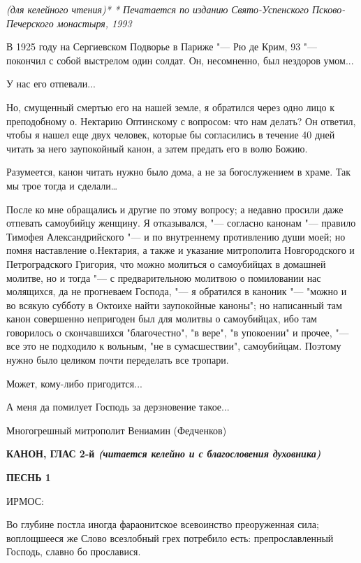 \mychapterending

 


\itshape (для келейного чтения)* * Печатается по изданию Свято-Успенского Псково-Печерского монастыря, 1993


В 1925 году на Сергиевском Подворье в Париже "--- Рю де Крим, 93 "--- покончил с собой выстрелом один солдат. Он, несомненно, был нездоров умом...


У нас его отпевали...


Но, смущенный смертью его на нашей земле, я обратился через одно лицо к преподобному о. Нектарию Оптинскому с вопросом: что нам делать? Он ответил, чтобы я нашел еще двух человек, которые бы согласились в течение 40 дней читать за него заупокойный канон, а затем предать его в волю Божию.


Разумеется, канон читать нужно было дома, а не за богослужением в храме. Так мы трое тогда и сделали…


После ко мне обращались и другие по этому вопросу; а недавно просили даже отпевать самоубийцу женщину. Я отказывался, "--- согласно канонам "--- правило Тимофея Александрийского "--- и по внутреннему противлению души моей; но помня наставление о.Нектария, а также и указание митрополита Новгородского и Петроградского Григория, что можно молиться о самоубийцах в домашней молитве, но и тогда "--- с предварительною молитвою о помиловании нас молящихся, да не прогневаем Господа, "--- я обратился в каноник "--- "можно и во всякую субботу в Oктоихе найти заупокойные каноны"; но написанный там канон совершенно непригоден был для молитвы о самоубийцах, ибо там говорилось о скончавшихся "благочестно", "в вере", "в упокоении" и прочее, "--- все это не подходило к вольным, "не в сумасшествии", самоубийцам. Поэтому нужно было целиком почти переделать все тропари.


Может, кому-либо пригодится...


А меня да помилует Господь за дерзновение такое...


Многогрешный митрополит Вениамин (Федченков)\normalfont{} 


\bfseries КАНОН, ГЛАС 2-й\normalfont{} \itshape (читается келейно и с благословения духовника)\normalfont{}


\bfseries ПЕСНЬ 1


ИРМОС:\normalfont{}


Во глубине постла иногда фараонитское всевоинство преоруженная сила; воплощшееся же Слово всезлобный грех потребило есть: препрославленный Господь, славно бо прославися.


